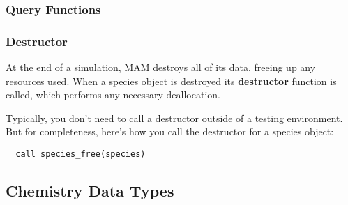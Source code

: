 \subsubsection*{Query Functions}

\subsubsection*{Destructor}

At the end of a simulation, MAM destroys all of its data, freeing up any
resources used. When a species object is destroyed its {\bf destructor }
function is called, which performs any necessary deallocation.

Typically, you don't need to call a destructor outside of a testing environment.
But for completeness, here's how you call the destructor for a species object:

\begin{verbatim}
  call species_free(species)
\end{verbatim}

\subsection{Chemistry Data Types}

